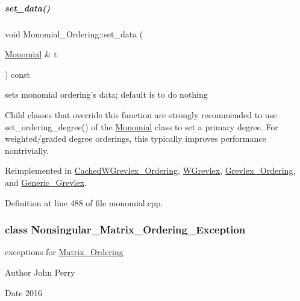 \mbox{\label{group__orderinggroup_a22b08dffd1cdf3a655ca18d604cfcee1}} 
\subparagraph{\texorpdfstring{set\+\_\+data()}{set\_data()}}
{\footnotesize\ttfamily void Monomial\+\_\+\+Ordering\+::set\+\_\+data (\begin{DoxyParamCaption}\item[{\hyperlink{group__polygroup_class_monomial}{Monomial} \&}]{t }\end{DoxyParamCaption}) const\hspace{0.3cm}{\ttfamily [virtual]}}



sets monomial ordering's data; default is to do nothing 

Child classes that override this function are strongly recommended to use set\+\_\+ordering\+\_\+degree() of the \hyperlink{group__polygroup_class_monomial}{Monomial} class to set a primary degree. For weighted/graded degree orderings, this typically improves performance nontrivially. 

Reimplemented in \hyperlink{group__orderinggroup_a65f1e27ee52413c91ffcb87632dcb27c}{Cached\+W\+Grevlex\+\_\+\+Ordering}, \hyperlink{group__orderinggroup_a18ba60cd0a76da002303a11d362142d9}{W\+Grevlex}, \hyperlink{group__orderinggroup_a83abd3e7505fe2096b01b8146bfdd83f}{Grevlex\+\_\+\+Ordering}, and \hyperlink{group__orderinggroup_a14c344858da03d16c8019afdae3da5dc}{Generic\+\_\+\+Grevlex}.



Definition at line 488 of file monomial.\+cpp.

\label{class_nonsingular___matrix___ordering___exception}
\subsubsection{class Nonsingular\+\_\+\+Matrix\+\_\+\+Ordering\+\_\+\+Exception}
exceptions for \hyperlink{group__orderinggroup_class_matrix___ordering}{Matrix\+\_\+\+Ordering} 

\begin{DoxyAuthor}{Author}
John Perry 
\end{DoxyAuthor}
\begin{DoxyDate}{Date}
2016 
\end{DoxyDate}


